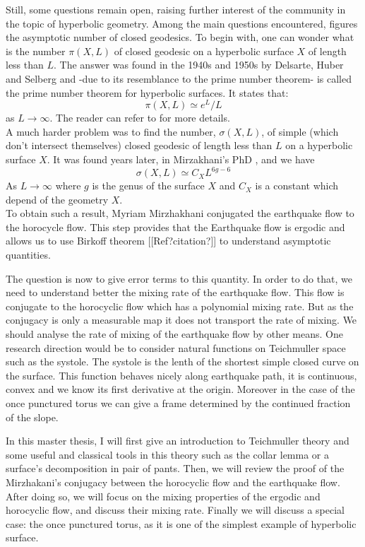 \vspace{10 px}

Still, some questions remain open, raising further interest of the community in the topic of hyperbolic geometry.
Among the main questions encountered, figures the asymptotic number of closed geodesics. To begin with, one can wonder what is the number $\pi(X,L)$ of closed geodesic on a hyperbolic surface $X$ of length less than $L$. The answer was found in the 1940s and 1950s by Delsarte, Huber and Selberg and -due to its resemblance to the prime number theorem- is called the prime number theorem for hyperbolic surfaces. It states that:\[
\pi(X,L) \simeq e^{L} / L
\]
as $L \to \infty$. The reader can refer to \cite{buser2010geometry} for more details.\\

A much harder problem was to find the number, $\sigma(X,L)$, of simple (which don't intersect themselves) closed geodesic of length less than $L$ on a hyperbolic surface $X$. It was found years later, in Mirzakhani's PhD \cite{mirzakhani2004simple}, and we have \[
\sigma(X,L) \simeq C_{X}L^{6g-6}
\]
As $L \to \infty$ where $g$ is the genus of the surface $X$ and $C_{X}$ is a constant which depend of the geometry $X$.\\
To obtain such a result, Myriam Mirzhakhani conjugated the earthquake flow to the horocycle flow. This step provides that the Earthquake flow is ergodic and allows us to use Birkoff theorem [[Ref?citation?]] to understand asymptotic quantities.

\vspace{10 px}

The question is now to give error terms to this quantity. In order to do that, we need to understand better the mixing rate of the earthquake flow. This flow is conjugate to the horocyclic flow which has a polynomial mixing rate. But as the conjugacy is only a measurable map it does not transport the rate of mixing. We should analyse the rate of mixing of the earthquake flow by other means. One research direction would be to consider natural functions on Teichmuller space such as the systole. The systole is the lenth of the shortest simple closed curve on the surface. This function behaves nicely along earthquake path, it is continuous, convex and we know its first derivative at the origin. Moreover in the case of the once punctured torus we can give a frame determined by the continued fraction of the slope.

\vspace{10 px}

In this master thesis, I will first give an introduction to Teichmuller theory and some useful and classical tools in this theory such as the collar lemma or a surface's decomposition in pair of pants. Then, we will review the proof of the Mirzhakani's conjugacy between the horocyclic flow and the earthquake flow. After doing so, we will focus on the mixing properties of the ergodic and horocyclic flow, and discuss their mixing rate. Finally we will discuss a special case: the once punctured torus, as it is one of the simplest example of hyperbolic surface.
